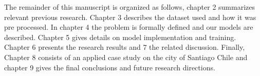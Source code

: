 The remainder of this manuscript is organized as follows, chapter 2 summarizes relevant previous research.
Chapter 3 describes the dataset used and how it was pre processed.
In chapter 4 the problem is formally defined and our models are described. Chapter 5 gives
details on model implementation and training. Chapter 6 presents the research results
and 7 the related discussion. Finally, Chapter 8 consists of an applied case study on the
city of Santiago Chile and chapter 9 gives the final conclusions and future research directions.
